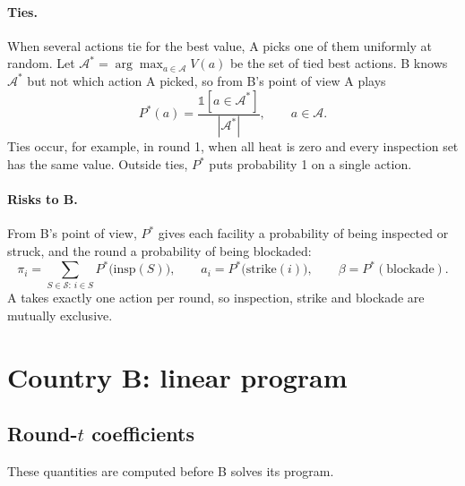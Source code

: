 \documentclass[11pt]{article}
\newcommand{\Sets}{\mathcal{S}}
\newcommand{\Acts}{\mathcal{A}}
\newcommand{\ind}{\mathbb{1}}
\newcommand{\insp}{\mathrm{insp}}
\newcommand{\strike}{\mathrm{strike}}
\newcommand{\blockade}{\mathrm{blockade}}
\begin{document}
\paragraph{Ties.}
When several actions tie for the best value, A picks one of them uniformly at random. Let
$\Acts^* = \arg\max_{a \in \Acts} V(a)$ be the set of tied best actions. B knows $\Acts^*$ but
not which action A picked, so from B's point of view A plays
\begin{equation}
  P^*(a) = \frac{\ind[a \in \Acts^*]}{|\Acts^*|} , \qquad a \in \Acts .
\end{equation}
Ties occur, for example, in round 1, when all heat is zero and every inspection set has the same
value. Outside ties, $P^*$ puts probability 1 on a single action.

\paragraph{Risks to B.}
From B's point of view, $P^*$ gives each facility a probability of being inspected or struck, and the round
a probability of being blockaded:
\begin{equation}
  \pi_i = \sum_{S \in \Sets : \, i \in S} P^*\big(\insp(S)\big), \qquad
  a_i = P^*\big(\strike(i)\big), \qquad
  \beta = P^*(\blockade).
\end{equation}
A takes exactly one action per round, so inspection, strike and blockade are mutually exclusive.

\section{Country B: linear program}
\label{sec:B}

\subsection{Round-$t$ coefficients}

These quantities are computed before B solves its program.
\end{document}
